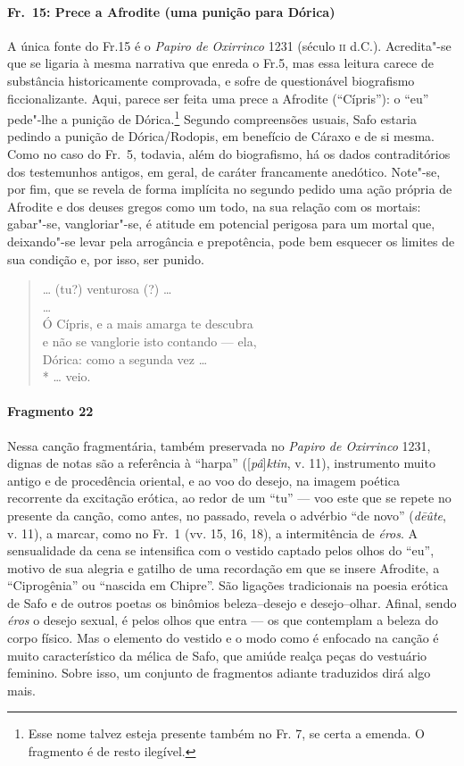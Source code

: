 \paragraph{Fr.~15: Prece a Afrodite (uma punição para Dórica)}

{\small A única fonte do Fr.15 é o \textit{Papiro de Oxirrinco} 1231 (século \textsc{ii} d.C.).
Acredita"-se que se ligaria à mesma narrativa que enreda o Fr.5, mas essa
leitura carece de substância historicamente comprovada, e sofre de
questionável biografismo ficcionalizante. Aqui,
parece ser feita uma prece a Afrodite (“Cípris”): o “eu” pede"-lhe a
punição de Dórica.\footnote{Esse nome talvez esteja presente também no Fr. 7, se certa a emenda. O fragmento é de resto ilegível.} Segundo compreensões usuais, Safo estaria pedindo a punição
de Dórica/Rodopis, em benefício de Cáraxo e de si mesma. Como no caso do Fr.~5,
todavia, além do biografismo, há os dados contraditórios dos testemunhos
antigos, em geral, de caráter francamente anedótico. Note"-se, por fim, que se
revela de forma implícita no segundo pedido uma ação própria de Afrodite e dos
deuses gregos como um todo, na sua relação com os mortais: gabar"-se,
vangloriar"-se, é atitude em potencial perigosa para um mortal que,
deixando"-se levar pela arrogância e prepotência, pode bem esquecer
os limites de sua condição e, por isso, ser punido.}

\begin{verse}
\ldots{} (tu?) venturosa (?) \ldots{}\\ 
\ldots{}\\
Ó Cípris, e a mais amarga te descubra\\
e não se vanglorie isto contando --- ela,\\
Dórica: como a segunda vez \ldots{}\\*
\ldots{} veio.
\end{verse}


\paragraph{Fragmento 22}

{\small Nessa canção fragmentária, também preservada no \textit{Papiro de Oxirrinco}
1231, dignas de notas são a referência à ``harpa'' ([\textit{pâ}]\textit{ktin}, v. 11), instrumento muito
antigo e de procedência oriental, e ao voo do desejo, na imagem poética
recorrente da excitação erótica, ao redor de um “tu” --- voo este que se repete
no presente da canção, como antes, no passado, revela o advérbio ``de
novo” (\textit{dēûte}, v. 11), a marcar, como no Fr.~1 (vv. 15, 16, 18), a intermitência de \textit{éros}. A sensualidade da cena se intensifica com o vestido captado pelos olhos do “eu”, motivo de sua alegria e gatilho de uma recordação em que se insere Afrodite, a
``Ciprogênia'' ou “nascida em Chipre”. São ligações tradicionais na
poesia erótica de Safo e de outros poetas os binômios beleza--desejo e
desejo--olhar. Afinal, sendo \textit{éros} o desejo sexual, é pelos olhos que entra --- os que contemplam a beleza do corpo físico. Mas o elemento do vestido e o modo como é enfocado na canção é muito característico da mélica de Safo, que amiúde realça peças do vestuário feminino. Sobre isso, um conjunto de fragmentos adiante traduzidos dirá algo mais.}

